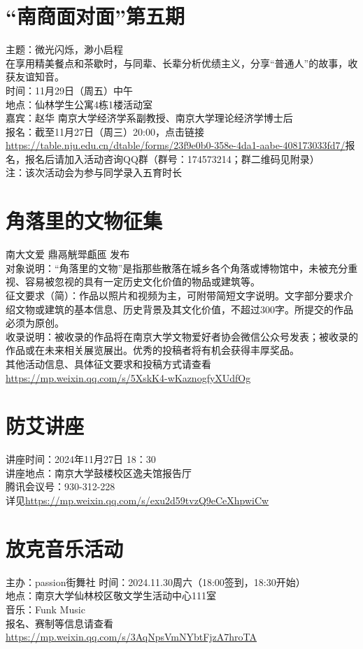 \documentclass[letterpaper, 12pt]{article}
\begin{document}
\begin{multicols}{2}
\section{“南商面对面”第五期}
主题：微光闪烁，渺小启程\\
在享用精美餐点和茶歇时，与同辈、长辈分析优绩主义，分享“普通人”的故事，收获友谊知音。\\
时间：11月29日（周五）中午\\
地点：仙林学生公寓4栋1楼活动室\\
嘉宾：赵华 南京大学经济学系副教授、南京大学理论经济学博士后\\
报名：截至11月27日（周三）20:00，点击链接\url{https://table.nju.edu.cn/dtable/forms/23f9e0b0-358e-4da1-aabe-408173033fd7/}报名，报名后请加入活动咨询QQ群（群号：174573214；群二维码见附录）\\
注：该次活动会为参与同学录入五育时长\\




\section{角落里的文物征集}
南大文爱 鼎鬲觥斝甗匜 发布\\
对象说明：“角落里的文物”是指那些散落在城乡各个角落或博物馆中，未被充分重视、容易被忽视的具有一定历史文化价值的物品或建筑等。\\
征文要求（简）：作品以照片和视频为主，可附带简短文字说明。文字部分要求介绍文物或建筑的基本信息、历史背景及其文化价值，不超过300字。所提交的作品必须为原创。\\
收录说明：被收录的作品将在南京大学文物爱好者协会微信公众号发表；被收录的作品或在未来相关展览展出。优秀的投稿者将有机会获得丰厚奖品。\\
其他活动信息、具体征文要求和投稿方式请查看\url{https://mp.weixin.qq.com/s/5XskK4-wKaznogfyXUdfOg}\\

\section{防艾讲座}
讲座时间：2024年11月27日 18：30\\
讲座地点：南京大学鼓楼校区逸夫馆报告厅\\
腾讯会议号：930-312-228\\
详见\url{https://mp.weixin.qq.com/s/exu2d59tvzQ9eCeXhpwiCw}

\section{放克音乐活动}
主办：passion街舞社
时间：2024.11.30周六（18:00签到，18:30开始）\\
地点：南京大学仙林校区敬文学生活动中心111室\\
音乐：Funk Music\\
报名、赛制等信息请查看\url{https://mp.weixin.qq.com/s/3AqNpsVmNYbtFjzA7hroTA}\\


\end{multicols}
\end{document}
